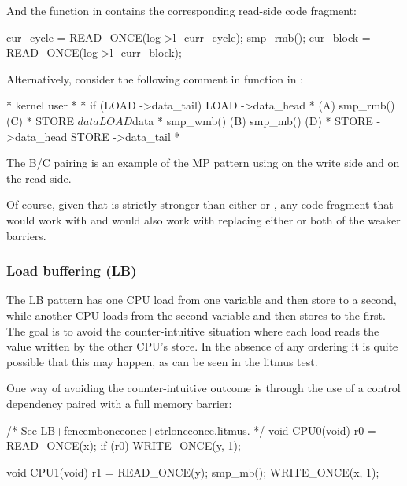 And the  function in 
contains the corresponding read-side code fragment:

\begin{VerbatimU}
	cur_cycle = READ_ONCE(log->l_curr_cycle);
	smp_rmb();
	cur_block = READ_ONCE(log->l_curr_block);
\end{VerbatimU}

Alternatively, consider the following comment in function
 in :

\begin{VerbatimU}
	 *   kernel                             user
	 *
	 *   if (LOAD ->data_tail) {            LOAD ->data_head
	 *                      (A)             smp_rmb()       (C)
	 *      STORE $data                     LOAD $data
	 *      smp_wmb()       (B)             smp_mb()        (D)
	 *      STORE ->data_head               STORE ->data_tail
	 *   }
\end{VerbatimU}

The B/C pairing is an example of the MP pattern using  on the
write side and  on the read side.

Of course, given that  is strictly stronger than either
 or , any code fragment that would work with
 and  would also work with 
replacing either or both of the weaker barriers.


\subsubsection{Load buffering (LB)}

The LB pattern has one CPU load from one variable and then store to a
second, while another CPU loads from the second variable and then stores
to the first.
The goal is to avoid the counter-intuitive situation where each load
reads the value written by the other CPU's store.
In the absence of any ordering it is quite possible that this may happen,
as can be seen in the  litmus test.

One way of avoiding the counter-intuitive outcome is through the use of a
control dependency paired with a full memory barrier:

\begin{VerbatimU}
	/* See LB+fencembonceonce+ctrlonceonce.litmus. */
	void CPU0(void)
	{
		r0 = READ_ONCE(x);
		if (r0)
			WRITE_ONCE(y, 1);
	}

	void CPU1(void)
	{
		r1 = READ_ONCE(y);
		smp_mb();
		WRITE_ONCE(x, 1);
	}
\end{VerbatimU}

